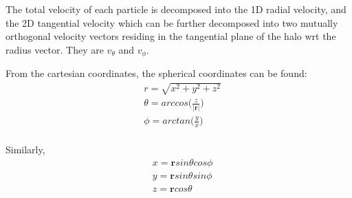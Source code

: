 The total velocity of each particle is decomposed into the 1D radial velocity, and the 2D tangential velocity which can be further decomposed into 
two mutually orthogonal velocity vectors residing in the tangential plane of the halo wrt the radius vector. They are $v_{\theta}$ and $v_{\phi}$.

From the cartesian coordinates, the spherical coordinates can be found: \\
\begin{equation}
\begin{aligned}
&r = \sqrt{x^2+y^2+z^2} \\ 
&\theta = arccos \bigg(\frac{z}{|\boldsymbol{r}|} \bigg)  \\
& \phi = arctan \bigg(\frac{y}{x} \bigg) \\
\end{aligned}
\end{equation}

Similarly,
\begin{equation}
\begin{aligned}
&x = \boldsymbol{r} sin\theta cos\phi \\ 
&y = \boldsymbol{r} sin\theta sin\phi  \\
&z = \boldsymbol{r} cos\theta \\
\end{aligned}
\end{equation}

